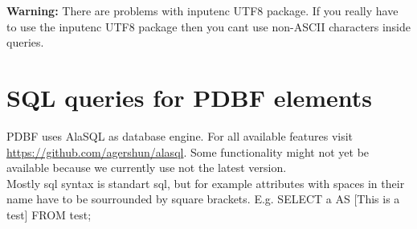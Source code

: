 \documentclass[11pt]{scrartcl}
\begin{document}
\noindent \textbf{Warning:} There are problems with inputenc UTF8 package. If you really have to use the inputenc UTF8 package then you cant use non-ASCII characters inside queries.

\section{SQL queries for PDBF elements}
PDBF uses AlaSQL as database engine. For all available features visit \url{https://github.com/agershun/alasql}. Some functionality might not yet be available because we currently use not the latest version.\\
Mostly sql syntax is standart sql, but for example attributes with spaces in their name have to be sourrounded by square brackets. E.g. SELECT a AS [This is a test] FROM test;\\
\end{document}
